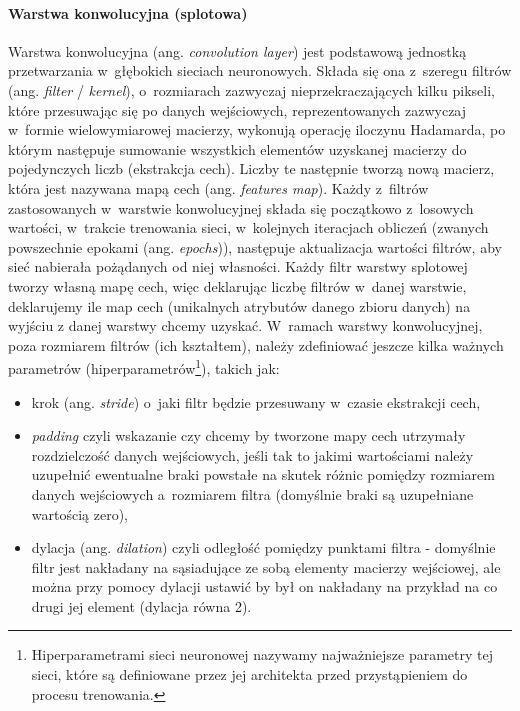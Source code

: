 \paragraph*{Warstwa konwolucyjna (splotowa)}

Warstwa konwolucyjna (ang. \emph{convolution layer}) jest podstawową jednostką przetwarzania w~głębokich sieciach neuronowych. Składa się ona z~szeregu filtrów (ang. \emph{filter} / \emph{kernel}), o~rozmiarach zazwyczaj nieprzekraczających kilku pikseli, które przesuwając się po danych wejściowych, reprezentowanych zazwyczaj w~formie wielowymiarowej macierzy, wykonują operację iloczynu Hadamarda, po którym następuje sumowanie wszystkich elementów uzyskanej macierzy do pojedynczych liczb (ekstrakcja cech). Liczby te następnie tworzą nową macierz, która jest nazywana mapą cech (ang. \emph{features map}). Każdy z~filtrów zastosowanych w~warstwie konwolucyjnej składa się początkowo z~losowych wartości, w~trakcie trenowania sieci, w~kolejnych iteracjach obliczeń (zwanych powszechnie epokami (ang. \emph{epochs})), następuje aktualizacja wartości filtrów, aby sieć nabierała pożądanych od niej własności. Każdy filtr warstwy splotowej tworzy własną mapę cech, więc deklarując liczbę filtrów w~danej warstwie, deklarujemy ile map cech (unikalnych atrybutów danego zbioru danych) na wyjściu z danej warstwy chcemy uzyskać. W~ramach warstwy konwolucyjnej, poza rozmiarem filtrów (ich kształtem), należy zdefiniować jeszcze kilka ważnych parametrów (hiperparametrów\footnote{Hiperparametrami sieci neuronowej nazywamy najważniejsze parametry tej sieci, które są definiowane przez jej architekta przed przystąpieniem do procesu trenowania.}), takich jak: 
\begin{itemize}
\item krok (ang. \emph{stride}) o~jaki filtr będzie przesuwany w~czasie ekstrakcji cech,
\item \emph{padding} czyli wskazanie czy chcemy by tworzone mapy cech utrzymały rozdzielczość danych wejściowych, jeśli tak to jakimi wartościami należy uzupełnić ewentualne braki powstałe na skutek różnic pomiędzy rozmiarem danych wejściowych a~rozmiarem filtra (domyślnie braki są uzupełniane wartością zero),
\item dylacja (ang. \emph{dilation}) czyli odległość pomiędzy punktami filtra - domyślnie filtr jest nakładany na sąsiadujące ze sobą elementy macierzy wejściowej, ale można przy pomocy dylacji ustawić by był on nakładany na przykład na co drugi jej element (dylacja równa 2).
\end{itemize}

